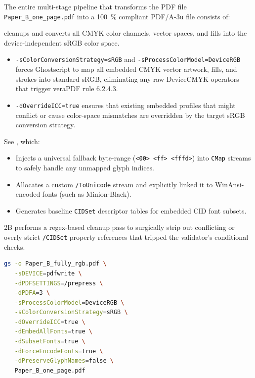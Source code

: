 \documentclass[12pt, twoside]{article}
\newcommand{\fname}[1]{\texttt{#1}}
\begin{document}
The entire multi-stage pipeline that transforms the \gls{PDF} file  \fname{Paper\_B\_one\_page.pdf} into a \qty{100}{\percent} compliant PDF/A-3u file consists of:
\begin{description}[style=nextline, labelwidth=\widthof{\textbf{Disadvantage}}, leftmargin=!]

\item [Ghostscript]  cleanups and converts all CMYK color channels, vector spaces, and fills into the device-independent sRGB color space.
\begin{itemize}
    \item \texttt{-sColorConversionStrategy=sRGB} and \texttt{-sProcessColorModel=DeviceRGB} forces Ghostscript to map all embedded CMYK vector artwork, fills, and strokes into standard sRGB, eliminating any raw DeviceCMYK operators that trigger veraPDF rule 6.2.4.3.

    \item \texttt{-dOverrideICC=true} ensures that existing embedded profiles that might conflict or cause color-space mismatches are overridden by the target sRGB conversion strategy.
\end{itemize}


\item[Python Part 1] See , which:
\begin{itemize}
    \item Injects a universal fallback byte-range (\texttt{<00> <ff> <fffd>}) into \texttt{CMap} streams to safely handle any unmapped glyph indices.

    \item Allocates a custom \texttt{/ToUnicode} stream and explicitly linked it to WinAnsi-encoded fonts (such as Minion-Black).

    \item Generates baseline \texttt{CIDSet} descriptor tables for embedded CID font subsets.
\end{itemize}

\item[Python Part 1] 2B performs a regex-based cleanup pass to surgically strip out conflicting or overly strict \texttt{/CIDSet} property references that tripped the validator's conditional checks.
\end{description}

\begin{lstlisting}[language={bash}, caption={Using ghostscript to correct the Paper\_B PDF file},label=lst:cleanPaperB]
gs -o Paper_B_fully_rgb.pdf \
   -sDEVICE=pdfwrite \
   -dPDFSETTINGS=/prepress \
   -dPDFA=3 \
   -sProcessColorModel=DeviceRGB \
   -sColorConversionStrategy=sRGB \
   -dOverrideICC=true \
   -dEmbedAllFonts=true \
   -dSubsetFonts=true \
   -dForceEncodeFonts=true \
   -dPreserveGlyphNames=false \
   Paper_B_one_page.pdf
\end{lstlisting}
\end{document}

